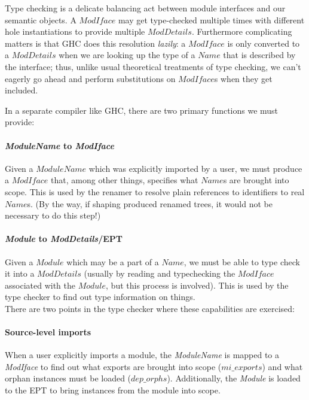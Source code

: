 \documentclass{article}
\newcommand{\I}[1]{\ensuremath{\mathit{#1}}}
\begin{document}
Type checking is a delicate balancing act between module
interfaces and our semantic objects.  A \I{ModIface} may get
type-checked multiple times with different hole instantiations
to provide multiple \I{ModDetails}.
Furthermore complicating matters
is that GHC does this resolution \emph{lazily}: a \I{ModIface}
is only converted to a \I{ModDetails} when we are looking up
the type of a \I{Name} that is described by the interface;
thus, unlike usual theoretical treatments of type checking, we can't
eagerly go ahead and perform substitutions on \I{ModIface}s when
they get included.

In a separate compiler like GHC, there are two primary functions we must provide:

\paragraph{\textit{ModuleName} to \textit{ModIface}}  Given a \I{ModuleName} which
was explicitly imported by a user, we must produce a \I{ModIface}
that, among other things, specifies what \I{Name}s are brought
into scope.  This is used by the renamer to resolve plain references
to identifiers to real \I{Name}s.  (By the way, if shaping produced
renamed trees, it would not be necessary to do this step!)

\paragraph{\textit{Module} to \textit{ModDetails}/EPT}  Given a \I{Module} which may be
a part of a \I{Name}, we must be able to type check it into
a \I{ModDetails} (usually by reading and typechecking the \I{ModIface}
associated with the \I{Module}, but this process is involved).  This
is used by the type checker to find out type information on things. \\

There are two points in the type checker where these capabilities are exercised:

\paragraph{Source-level imports}  When a user explicitly imports a
module, the \textit{ModuleName} is mapped to a \textit{ModIface}
to find out what exports are brought into scope (\I{mi\_exports})
and what orphan instances must be loaded (\I{dep\_orphs}).  Additionally,
the \textit{Module} is loaded to the EPT to bring instances from
the module into scope.
\end{document}
